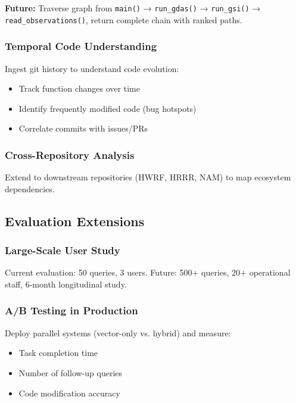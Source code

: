 \documentclass[11pt,letterpaper]{article}
\begin{document}
\textbf{Future:} Traverse graph from \texttt{main()} → \texttt{run\_gdas()} → \texttt{run\_gsi()} → \texttt{read\_observations()}, return complete chain with ranked paths.

\subsubsection{Temporal Code Understanding}

Ingest git history to understand code evolution:
\begin{itemize}
    \item Track function changes over time
    \item Identify frequently modified code (bug hotspots)
    \item Correlate commits with issues/PRs
\end{itemize}

\subsubsection{Cross-Repository Analysis}

Extend to downstream repositories (HWRF, HRRR, NAM) to map ecosystem dependencies.

\subsection{Evaluation Extensions}

\subsubsection{Large-Scale User Study}

Current evaluation: 50 queries, 3 users. Future: 500+ queries, 20+ operational staff, 6-month longitudinal study.

\subsubsection{A/B Testing in Production}

Deploy parallel systems (vector-only vs. hybrid) and measure:
\begin{itemize}
    \item Task completion time
    \item Number of follow-up queries
    \item Code modification accuracy
\end{itemize}
\end{document}
